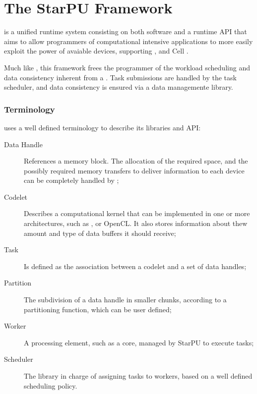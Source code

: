 \documentclass[main.tex]{subfiles}
\begin{document}
\chapter{The StarPU Framework} \label{section:starpu}



\starpu \cite{augonnet2011starpu} is a unified runtime system consisting on both software and a runtime API that aims to allow programmers of computational intensive applications to more easily exploit the power of avaiable devices, supporting \cpus, \gpus and Cell .

Much like \gama, this framework frees the programmer of the workload scheduling and data consistency inherent from a \hetplat. Task submissions are handled by the \starpu task scheduler, and data consistency is ensured via a data managemente library.

\subsection{Terminology}

\starpu uses a well defined terminology to describe its libraries and API:

\begin{description}
  \item[Data Handle] References a memory block. The allocation of the required space, and the possibly required memory transfers to deliver information to each device can be completely handled by \starpu;

  \item[Codelet] Describes a computational kernel that can be implemented in one or more architectures, such as \cpus, \cuda or \acs{OpenCL}. It also stores information about thew amount and type of data buffers it should receive;

  \item[Task] Is defined as the association between a codelet and a set of data handles;

  \item[Partition] The subdivision of a data handle in smaller chunks, according to a partitioning function, which can be user defined;

  \item[Worker] A processing element, such as a \cpu core, managed by StarPU to execute tasks;

  \item[Scheduler] The library in charge of assigning tasks to workers, based on a well defined scheduling policy.

\end{description}
\end{document}
